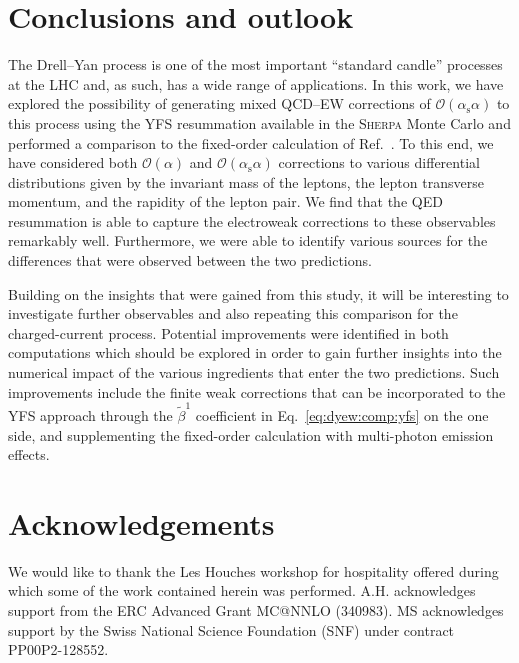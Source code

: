 \documentclass[11pt]{cernrep}
\newcommand{\order}{\ensuremath{\mathcal{O}}}
\newcommand{\alphas}{\ensuremath{\alpha_\mathrm{s}}}
\begin{document}
\section{Conclusions and outlook}
\label{sec:dyew:conclusions}

The Drell--Yan process is one of the most important ``standard candle'' 
processes at the LHC and, as such, has a wide range of applications.
In this work, we have explored the possibility of generating mixed 
QCD--EW corrections of $\order(\alphas\alpha)$ to this process using 
the YFS resummation available in the \textsc{Sherpa} Monte Carlo and 
performed a comparison to the fixed-order calculation of 
Ref.~\cite{Dittmaier:2015rxo}. To this end, we have considered both 
$\order(\alpha)$ and $\order(\alphas\alpha)$ corrections to various 
differential distributions given by the invariant mass of the leptons, 
the lepton transverse momentum, and the rapidity of the lepton pair.
We find that the QED resummation is able to capture the electroweak 
corrections to these observables remarkably well.
Furthermore, we were able to identify various sources for the differences 
that were observed between the two predictions.

Building on the insights that were gained from this study, it will 
be interesting to investigate further observables and also repeating 
this comparison for the charged-current process. Potential 
improvements were identified in both computations which should be 
explored in order to gain further insights into the numerical impact of 
the various ingredients that enter the two predictions. Such 
improvements include the finite weak corrections that can be 
incorporated to the YFS approach through the $\tilde{\beta}^1$ 
coefficient in Eq.~\eqref{eq:dyew:comp:yfs} on the one side, and 
supplementing the fixed-order calculation with multi-photon emission 
effects. 


\section*{Acknowledgements}

We would like to thank the Les Houches workshop for hospitality offered 
during which some of the work contained herein was performed. 
A.H. acknowledges support from the ERC Advanced Grant MC@NNLO (340983). 
MS acknowledges support by the Swiss National Science Foundation (SNF) 
under contract PP00P2-128552.


\end{document}

